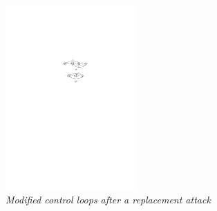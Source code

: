 \begin{figure}
\begin{center}
\includegraphics[width= 50mm]{motivational_example_replaced.pdf}
\end{center}
\caption{{\em Modified control loops after a replacement attack}}
\label{replaced}
\end{figure}



